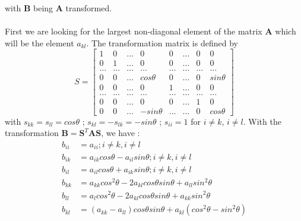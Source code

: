 \documentclass[a4paper, twoside, 11pt]{report}
\theoremstyle{theorem}
\theoremstyle{remark}
\theoremstyle{exemple}
\begin{document}
        with $\mathbf{B}$ being $\mathbf{A}$ transformed.

        \paragraph{}First we are looking for the largest non-diagonal element of the matrix $\mathbf{A}$ which will be the element $a_{kl}$. The transformation matrix is defined by
        \begin{equation*}
            S= \begin{bmatrix} 1 & 0 & \dots & 0 & 0 & \dots & 0 & 0 \\
                               0 & 1 & \dots & 0 & 0 & \dots & 0 & 0 \\
                               \dots & \dots & \dots & \dots & \dots & \dots & \dots & \dots \\
                               0 & 0 & \dots & cos \theta & 0 & \dots & 0 & sin \theta \\
                               0 & 0 & \dots & 0 & 1 & \dots & 0 & 0 \\
                               \dots & \dots & \dots & \dots & \dots & \dots & \dots & \dots \\
                               0 & 0 & \dots & 0 & 0 & \dots & 1 & 0 \\
                               0 & 0 & \dots & -sin\theta & \dots & \dots & 0 & cos \theta
                \end{bmatrix}   
        \end{equation*}
    with $s_{kk}=s_{ll}=cos\theta$ ; $s_{kl}=-s_{lk}=-sin\theta$ ; $s_{ii}=1$ for $i\neq k$, $i \neq l$.
    With the transformation $\mathbf{B}=\mathbf{S}^T \mathbf{AS}$, we have :
        \begin{align*}
            b_{ii} &= a_{ii} ; i\neq k, i\neq l \\
            b_{ik} &= a_{ik}cos\theta-a_{il}sin\theta ; i\neq k, i \neq l \\
            b_{il} &= a_{il}cos\theta + a_{ik}sin\theta ; i\neq k, i\neq l \\
            b_{kk} &= a_{kk}cos^2\theta - 2a_{kl}cos\theta sin\theta + a_{ll}sin^2\theta \\
            b_{ll} &= a_{l}cos^2\theta - 2a_{kl}cos\theta sin\theta + a_{kk}sin^2\theta \\
            b_{kl} &= (a_{kk}-a_{ll})cos\theta sin\theta + a_{kl}(cos^2\theta - sin^2\theta)
        \end{align*}
        
\end{document}
